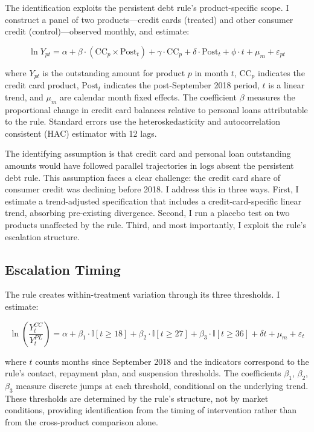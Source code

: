 \documentclass[12pt]{article}
\newcommand{\ind}{\mathbb{I}}
\begin{document}
The identification exploits the persistent debt rule's product-specific scope. I construct a panel of two products---credit cards (treated) and other consumer credit (control)---observed monthly, and estimate:

\begin{equation}
\ln Y_{pt} = \alpha + \beta \cdot (\text{CC}_p \times \text{Post}_t) + \gamma \cdot \text{CC}_p + \delta \cdot \text{Post}_t + \phi \cdot t + \mu_m + \varepsilon_{pt}
\label{eq:did}
\end{equation}

\noindent where $Y_{pt}$ is the outstanding amount for product $p$ in month $t$, $\text{CC}_p$ indicates the credit card product, $\text{Post}_t$ indicates the post-September 2018 period, $t$ is a linear trend, and $\mu_m$ are calendar month fixed effects. The coefficient $\beta$ measures the proportional change in credit card balances relative to personal loans attributable to the rule. Standard errors use the \citet{newey1987} heteroskedasticity and autocorrelation consistent (HAC) estimator with 12 lags.

The identifying assumption is that credit card and personal loan outstanding amounts would have followed parallel trajectories in logs absent the persistent debt rule. This assumption faces a clear challenge: the credit card share of consumer credit was declining before 2018. I address this in three ways. First, I estimate a trend-adjusted specification that includes a credit-card-specific linear trend, absorbing pre-existing divergence. Second, I run a placebo test on two products unaffected by the rule. Third, and most importantly, I exploit the rule's escalation structure.

\subsection{Escalation Timing}

The rule creates within-treatment variation through its three thresholds. I estimate:

\begin{equation}
\ln \left( \frac{Y^{CC}_t}{Y^{PL}_t} \right) = \alpha + \beta_1 \cdot \ind[t \geq 18] + \beta_2 \cdot \ind[t \geq 27] + \beta_3 \cdot \ind[t \geq 36] + \delta t + \mu_m + \varepsilon_t
\label{eq:escalation}
\end{equation}

\noindent where $t$ counts months since September 2018 and the indicators correspond to the rule's contact, repayment plan, and suspension thresholds. The coefficients $\beta_1$, $\beta_2$, $\beta_3$ measure discrete jumps at each threshold, conditional on the underlying trend. These thresholds are determined by the rule's structure, not by market conditions, providing identification from the timing of intervention rather than from the cross-product comparison alone.
\end{document}
